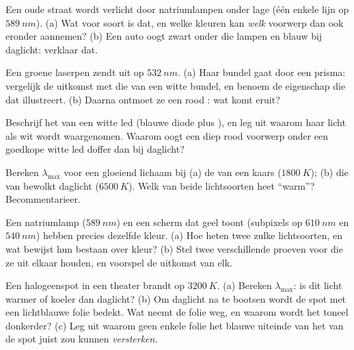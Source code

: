 \begin{exercise}[$\star\star$]\label{exo:g11:color-light-sources:8}
Een oude straat wordt verlicht door natriumlampen onder lage  (één
enkele lijn op $\qty{589}{nm}$). (a) Wat voor soort  is dat, en
welke kleuren kan \emph{welk} voorwerp dan ook eronder aannemen? (b) Een
auto oogt zwart onder die lampen en blauw bij daglicht: verklaar dat.
\end{exercise}

\begin{exercise}[$\star\star$]\label{exo:g11:color-light-sources:9}
Een groene laserpen zendt uit op $\qty{532}{nm}$. (a) Haar bundel gaat
door een prisma: vergelijk de uitkomst met die van een witte bundel, en
benoem de eigenschap die dat illustreert. (b) Daarna ontmoet ze een rood
: wat komt eruit?
\end{exercise}

\begin{exercise}[$\star\star$]\label{exo:g11:color-light-sources:10}
Beschrijf het  van een witte led (blauwe diode plus ), en
leg uit waarom haar licht als wit wordt waargenomen. Waarom oogt een diep
rood voorwerp onder een goedkope witte led doffer dan bij daglicht?
\end{exercise}

\begin{exercise}[$\star\star$]\label{exo:g11:color-light-sources:11}
Bereken $\lambda_{\max}$ voor een gloeiend lichaam bij (a) de
 van een kaars ($\qty{1800}{K}$); (b) die van bewolkt
daglicht ($\qty{6500}{K}$). Welk van beide lichtsoorten heet ``warm''?
Becommentarieer.
\end{exercise}

\begin{exercise}[$\star\star\star$]\label{exo:g11:color-light-sources:12}
Een natriumlamp ($\qty{589}{nm}$) en een scherm dat geel toont
(subpixels op $\qty{610}{nm}$ en $\qty{540}{nm}$) hebben precies dezelfde
kleur. (a) Hoe heten twee zulke lichtsoorten, en wat bewijst hun bestaan
over kleur? (b) Stel twee verschillende proeven voor die ze uit elkaar
houden, en voorspel de uitkomst van elk.
\end{exercise}

\begin{exercise}[$\star\star\star$]\label{exo:g11:color-light-sources:13}
Een halogeenspot in een theater brandt op $\qty{3200}{K}$. (a) Bereken
$\lambda_{\max}$: is dit licht warmer of koeler dan daglicht? (b) Om
daglicht na te bootsen wordt de spot met een lichtblauwe folie bedekt.
Wat neemt de folie weg, en waarom wordt het toneel donkerder? (c) Leg uit
waarom geen enkele folie het blauwe uiteinde van het  van de spot
juist zou kunnen \emph{versterken}.
\end{exercise}

